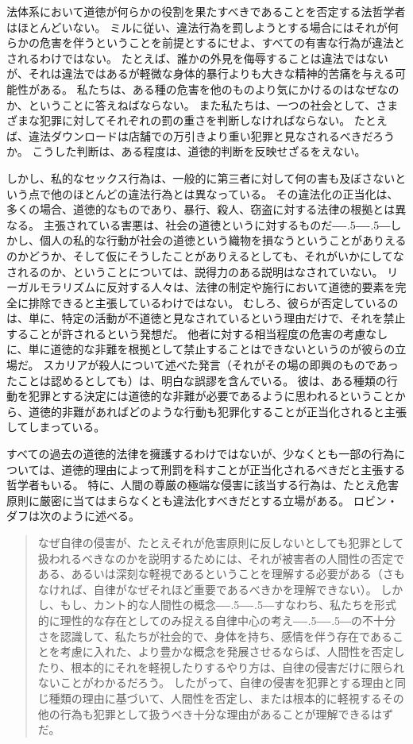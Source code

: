 \documentclass[paper=a4,book,openany]{jlreq}
\def\DDASH{―\kern-.5\zw―\kern-.5\zw―}
\begin{document}
法体系において道徳が何らかの役割を果たすべきであることを否定する法哲学者はほとんどいない。
ミルに従い、違法行為を罰しようとする場合にはそれが何らかの危害を伴うということを前提とするにせよ、すべての有害な行為が違法とされるわけではない。
たとえば、誰かの外見を侮辱することは違法ではないが、それは違法ではあるが軽微な身体的暴行よりも大きな精神的苦痛を与える可能性がある。
私たちは、ある種の危害を他のものより気にかけるのはなぜなのか、ということに答えねばならない。
また私たちは、一つの社会として、さまざまな犯罪に対してそれぞれの罰の重さを判断しなければならない。
たとえば、違法ダウンロードは店舗での万引きより重い犯罪と見なされるべきだろうか。
こうした判断は、ある程度は、道徳的判断を反映せざるをえない。

しかし、私的なセックス行為は、一般的に第三者に対して何の害も及ぼさないという点で他のほとんどの違法行為とは異なっている。
その違法化の正当化は、多くの場合、道徳的なものであり、暴行、殺人、窃盗に対する法律の根拠とは異なる。
主張されている害悪は、社会の道徳というに対するものだ{\DDASH}しかし、個人の私的な行動が社会の道徳という織物を損なうということがありえるのかどうか、そして仮にそうしたことがありえるとしても、それがいかにしてなされるのか、ということについては、説得力のある説明はなされていない。
リーガルモラリズムに反対する人々は、法律の制定や施行において道徳的要素を完全に排除できると主張しているわけではない。
むしろ、彼らが否定しているのは、単に、特定の活動が不道徳と見なされているという理由だけで、それを禁止することが許されるという発想だ。
他者に対する相当程度の危害の考慮なしに、単に道徳的な非難を根拠として禁止することはできないというのが彼らの立場だ。
スカリアが殺人について述べた発言（それがその場の即興のものであったことは認めるとしても）は、明白な誤謬を含んでいる。
彼は、ある種類の行動を犯罪とする決定には道徳的な非難が必要であるように思われるということから、道徳的非難があればどのような行動も犯罪化することが正当化されると主張してしまっている。

すべての過去の道徳的法律を擁護するわけではないが、少なくとも一部の行為については、道徳的理由によって刑罰を科すことが正当化されるべきだと主張する哲学者もいる。
特に、人間の尊厳の極端な侵害に該当する行為は、たとえ危害原則に厳密に当てはまらなくとも違法化すべきだとする立場がある。
ロビン・ダフは次のように述べる。

\begin{quote}
なぜ自律の侵害が、たとえそれが危害原則に反しないとしても犯罪として扱われるべきなのかを説明するためには、それが被害者の人間性の否定である、あるいは深刻な軽視であるということを理解する必要がある（さもなければ、自律がなぜそれほど重要であるべきかを理解できない）。
しかし、もし、カント的な人間性の概念{\DDASH}すなわち、私たちを形式的に理性的な存在としてのみ捉える自律中心の考え{\DDASH}の不十分さを認識して、私たちが社会的で、身体を持ち、感情を伴う存在であることを考慮に入れた、より豊かな概念を発展させるならば、人間性を否定したり、根本的にそれを軽視したりするやり方は、自律の侵害だけに限られないことがわかるだろう。
したがって、自律の侵害を犯罪とする理由と同じ種類の理由に基づいて、人間性を否定し、または根本的に軽視するその他の行為も犯罪として扱うべき十分な理由があることが理解できるはずだ。
\citep[p.43]{duff01:_harms_wrong}
\end{quote}
\end{document}
